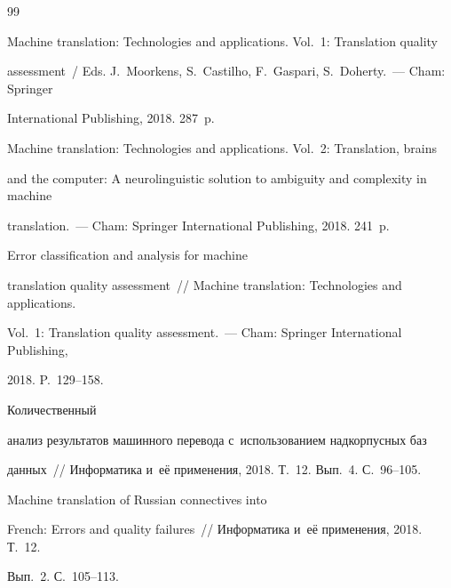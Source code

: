 {\small\frenchspacing


{%




\begin{thebibliography}{99}







Machine translation: Technologies and applications. Vol.~1: Translation quality 


assessment~/ Eds. J.~Moorkens, S.~Castilho, F.~Gaspari, S.~Doherty.~--- Cham: Springer 


International Publishing, 2018. 287~p.






Machine translation: Technologies and applications. Vol.~2:  Translation, brains 


and the computer: A neurolinguistic solution to ambiguity and complexity in machine 


translation.~--- Cham: Springer International Publishing, 2018. 241~p.




 Error classification and analysis for machine 


translation quality assessment~/\!\!/ Machine translation: Technologies and applications. 


Vol.~1: Translation quality assessment.~--- Cham: Springer International Publishing, 


2018. P.~129--158.




 Количественный 


анализ результатов машинного перевода с~использованием надкорпусных баз 


данных~/\!\!/ Информатика и~её применения, 2018. Т.~12. Вып.~4. С.~96--105.




 Machine translation of Russian connectives into 


French: Errors and quality failures~/\!\!/ Информатика и~её применения, 2018. Т.~12. 


Вып.~2. С.~105--113.





\end{thebibliography}}}
